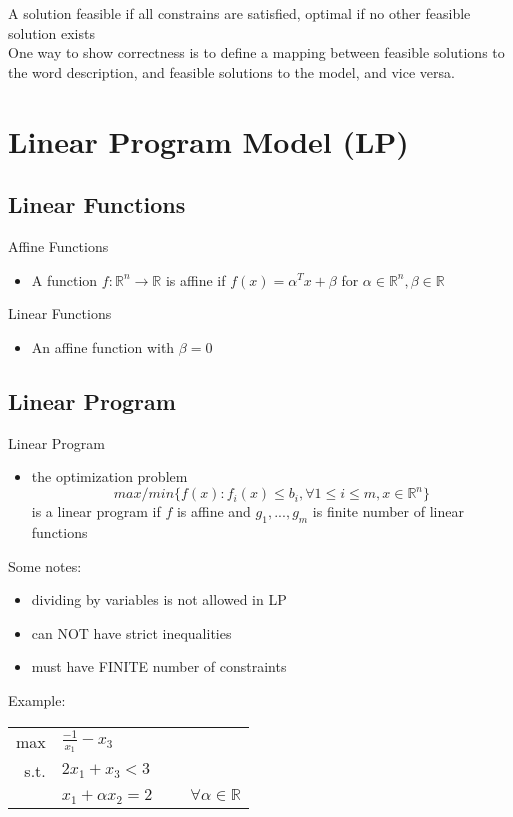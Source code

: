 \documentclass[letterpaper, 12pt]{article}
\begin{document}
{    A solution feasible if all constrains are satisfied, optimal if no other feasible solution exists\\
    \bigskip
    One way to show correctness is to define a mapping between feasible solutions to the word description, and feasible solutions to the model, and vice versa.\\
    \pagebreak

    \section{Linear Program Model (LP)}

    \subsection{Linear Functions}
    Affine Functions
    \begin{itemize}
        \item A function $f : \mathbb{R}^n \rightarrow \mathbb{R}$ is affine if $f(x) = \alpha^Tx + \beta$ for $\alpha \in \mathbb{R}^n, \beta \in \mathbb{R}$
    \end{itemize}
    Linear Functions
    \begin{itemize}
        \item An affine function with $\beta = 0$
    \end{itemize}

    \subsection{Linear Program}
    Linear Program
    \begin{itemize}
        \item the optimization problem $$max/min\{f(x):f_i(x) \leq b_i, \forall1 \leq i \leq m, x \in \mathbb{R}^n\}$$ is a linear program if $f$ is affine and $g_1,...,g_m$ is finite number of linear functions\\
    \end{itemize}
    
    \bigskip
    Some notes:
    \begin{itemize}
        \item dividing by variables is not allowed in LP
        \item can NOT have strict inequalities
        \item must have FINITE number of constraints
    \end{itemize}
    
    Example:\\
    \bigskip
    \begin{tabular}{rl}
        max & $\frac{-1}{x_1} - x_3$\\
        s.t. & $2x_1 + x_3 < 3$\\
        &$x_1 + \alpha x_2 = 2\hspace{1cm}\forall\alpha\in\mathbb{R}$\\
    \end{tabular}
    \bigskip

}
\end{document}
